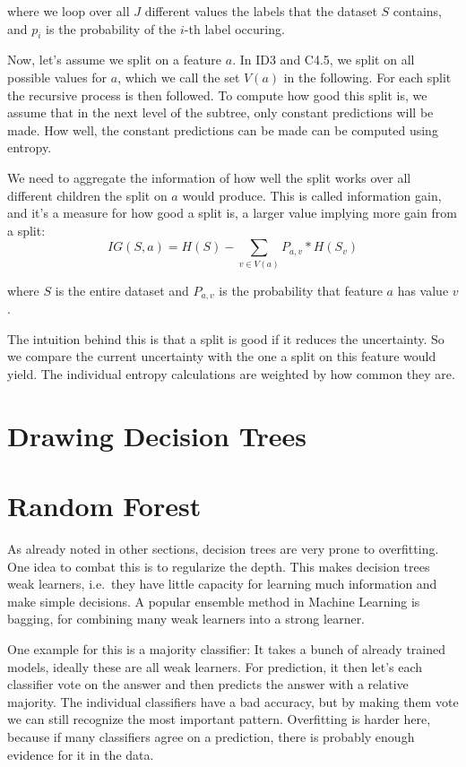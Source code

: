\documentclass[a4paper]{article}
\begin{document}
\noindent where we loop over all $J$ different values the labels that the dataset $S$ contains, and $p_i$ is the probability of the $i$-th label occuring.

Now, let's assume we split on a feature $a$. In ID3 and C4.5, we split on all possible values for $a$, which we call the set $V(a)$ in the following. For each split the recursive process is then followed. To compute how good this split is, we assume that in the next level of the subtree, only constant predictions will be made. How well, the constant predictions can be made can be computed using entropy.

We need to aggregate the information of how well the split works over all different children the split on $a$ would produce. This is called information gain, and it's a measure for how good a split is, a larger value implying more gain from a split:
\[
	\mathit{IG}(S, a) = H(S) - \sum\limits_{v \in V(a)} P_{a, v} * H(S_v)
\]

\noindent where $S$ is the entire dataset and $P_{a, v}$ is the probability that feature $a$ has value $v$.

The intuition behind this is that a split is good if it reduces the uncertainty. So we compare the current uncertainty with the one a split on this feature would yield. The individual entropy calculations are weighted by how common they are.

\section{Drawing Decision Trees}

\section{Random Forest}

As already noted in other sections, decision trees are very prone to overfitting. One idea to combat this is to regularize the depth. This makes decision trees weak learners, i.e.\ they have little capacity for learning much information and make simple decisions. A popular ensemble method in Machine Learning is bagging, for combining many weak learners into a strong learner.

One example for this is a majority classifier: It takes a bunch of already trained models, ideally these are all weak learners. For prediction, it then let's each classifier vote on the answer and then predicts the answer with a relative majority. The individual classifiers have a bad accuracy, but by making them vote we can still recognize the most important pattern. Overfitting is harder here, because if many classifiers agree on a prediction, there is probably enough evidence for it in the data.
\end{document}
